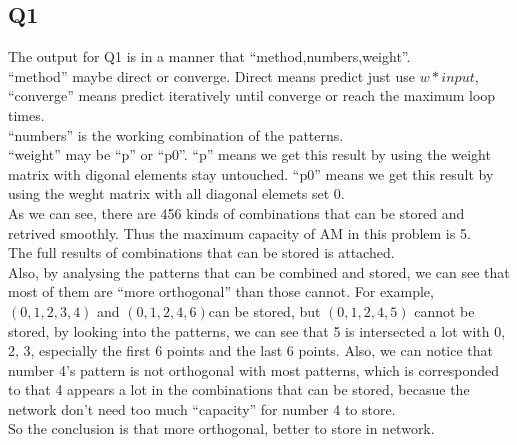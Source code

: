 \documentclass{article}
\begin{document}
  \subsection{Q1}
  The output for Q1 is in a manner that ``method,numbers,weight''.\\
  ``method'' maybe direct or converge. Direct means predict just use $w*input$,
  ``converge'' means predict iteratively until converge or reach the maximum
  loop times.\\
  ``numbers'' is the working combination of the patterns.\\
  ``weight'' may be ``p'' or ``p0''. ``p'' means we get this result by using the
  weight matrix with digonal elements stay untouched. ``p0'' means we get this
  result by using the weght matrix with all diagonal elemets set 0.\\
  As we can see, there are 456 kinds of combinations that can be stored and
  retrived smoothly. Thus the maximum capacity of AM in this problem is 5.\\
  The full results of combinations that can be stored is attached.\\
  Also, by analysing the patterns that can be combined and stored, we can see
  that most of them are ``more orthogonal'' than those cannot. For example,
  $(0, 1, 2, 3, 4)$ and $(0, 1, 2, 4, 6)$can be stored, but $(0, 1, 2, 4, 5)$
  cannot be stored, by looking into the patterns, we can see that 5 is
  intersected a lot with 0, 2, 3, especially the first 6 points and the last 6
  points. Also, we can notice that number 4's pattern is not orthogonal with
  most patterns, which is corresponded to that 4 appears a lot in the
  combinations that can be stored, becasue the network don't need too much
  ``capacity'' for number 4 to store.\\
  So the conclusion is that more orthogonal, better to store in network.
\end{document}
